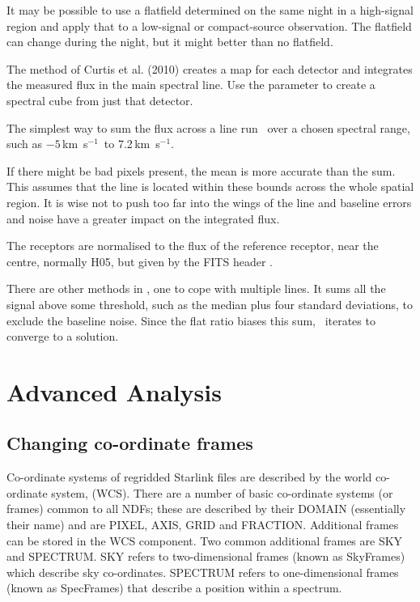 \documentclass[11pt,oneside,chapters]{starlink}
\newcommand{\kms}{\mbox{$\,$km~s$^{-1}$}}   %
\newcommand{\kms}{\,km~s$^{-1}$}   %
\begin{document}
It may be possible to use a flatfield determined on the same night
in a high-signal region and apply that to a low-signal or
compact-source observation.  The flatfield can change during the
night, but it might better than no flatfield.

The method of Curtis et al. (2010)\cite{flat} creates a map for each detector
and integrates the measured flux in the main spectral line.  Use the
 parameter to create a spectral cube from just that
detector.

\begin{terminalv}
\end{terminalv}

The simplest way to sum the flux across a line run \stats\ over a chosen
spectral range, such as $-5$\kms\ to 7.2\kms.

\begin{terminalv}
\end{terminalv}

If there might be bad pixels present, the mean is more accurate than the sum.
This assumes that the line is located within these bounds across the whole
spatial region.  It is wise not to push too far into the wings of the line and
baseline errors and noise have a greater impact on the integrated flux.

The receptors are normalised to the flux of the reference receptor,
near the centre, normally H05, but given by the FITS header .


There are other methods in \ORACDR, one to cope with multiple lines.
It sums all the signal above some threshold, such as the median plus four
standard deviations, to exclude the baseline noise.  Since the flat
ratio biases this sum, \ORACDR\ iterates to converge to a solution.

\clearpage
\chapter{Advanced Analysis}
\label{sec:advanced}

\section{Changing co-ordinate frames}

Co-ordinate systems of regridded Starlink files are described by the
world co-ordinate system, (WCS). There are a number of basic co-ordinate
systems (or frames) common to all NDFs; these are described by their
DOMAIN (essentially their name) and are PIXEL, AXIS, GRID and
FRACTION. Additional frames can be stored in the WCS component. Two
common additional frames are SKY and SPECTRUM. SKY refers to
two-dimensional frames (known as SkyFrames) which describe sky
co-ordinates. SPECTRUM refers to one-dimensional frames (known as
SpecFrames) that describe a position within a spectrum.
\end{document}
